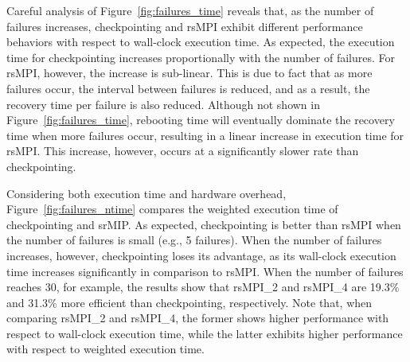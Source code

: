 Careful analysis of Figure~\ref{fig:failures_time} reveals that, as the number of failures increases, checkpointing and rsMPI exhibit different performance behaviors with respect to wall-clock execution time. As expected, the execution time for checkpointing increases proportionally with the number of failures. For rsMPI, however, the increase is sub-linear. This is due to fact that as more failures occur, the interval between failures is reduced, and as a result, the recovery time per failure is also reduced. Although not shown in Figure~\ref{fig:failures_time}, rebooting time will eventually dominate the recovery time when more failures occur, resulting in a linear increase in execution time for rsMPI. This increase, however, occurs at a significantly slower rate than checkpointing.

Considering both execution time and hardware overhead, Figure~\ref{fig:failures_ntime} compares the weighted execution time of checkpointing and srMIP.  As expected, checkpointing is better than rsMPI when the number of  failures is small (e.g., 5 failures).  When the number of failures increases,  however, checkpointing loses its advantage, as its wall-clock execution time increases significantly in comparison to rsMPI.  When the number of failures reaches 30, for example, the results show that rsMPI\_2 and rsMPI\_4 are 19.3\% and 31.3\% more efficient than  checkpointing, respectively.
Note that, when comparing rsMPI\_2 and rsMPI\_4, the former shows higher performance with respect to wall-clock execution time, while the latter exhibits higher performance with respect to weighted execution time. 
